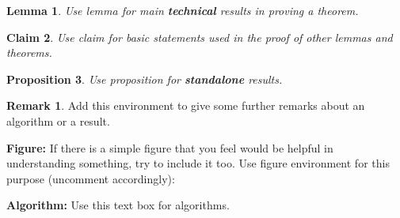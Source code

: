 \documentclass{article}
\newenvironment{tbox}{\begin{tcolorbox}[
		enlarge top by=5pt,
		enlarge bottom by=5pt,
		 breakable,
		 boxsep=0pt,
                  left=4pt,
                  right=4pt,
                  top=10pt,
                  arc=0pt,
                  boxrule=1pt,toprule=1pt,
                  colback=white
                  ]%
	}
{\end{tcolorbox}}
\newtheorem{lemma}{Lemma}
\newtheorem{proposition}[lemma]{Proposition}
\newtheorem{claim}[lemma]{Claim}
\theoremstyle{definition}
\newtheorem*{mdremark}{Remark}
\newenvironment{remark}{\begin{mdframed}[backgroundcolor=lightgray!40,topline=false,bottomline=false, innerbottommargin=12pt,innertopmargin=12pt]\begin{mdremark}}{\end{mdremark}\end{mdframed}}
\begin{document}
\begin{lemma}
	Use lemma for main \textbf{technical} results in proving a theorem. 
\end{lemma}

\begin{claim}
	Use claim for basic statements used in the proof of other lemmas and theorems. 
\end{claim}

\begin{proposition}
	Use proposition for \textbf{standalone} results. 
\end{proposition}

\begin{remark}
	Add this environment to give some further remarks about an algorithm or a result.
\end{remark}


\textbf{Figure:}	
If there is a simple figure that you feel would be helpful in understanding something, try to include it too. Use figure environment for this purpose (uncomment accordingly): 
	

\begin{tbox}
	\textbf{Algorithm:} Use this text box for algorithms. 
\end{tbox}
\end{document}
